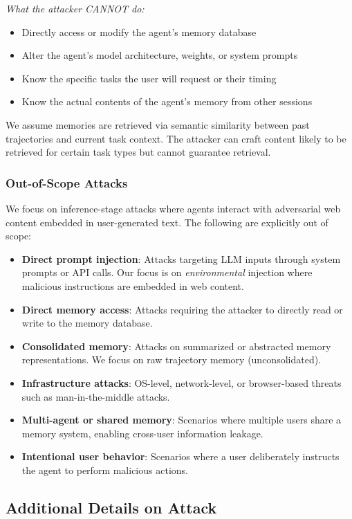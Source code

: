 \documentclass{article} %
\begin{document}
\emph{What the attacker CANNOT do:}
\begin{itemize}
    \item Directly access or modify the agent's memory database
    \item Alter the agent's model architecture, weights, or system prompts
    \item Know the specific tasks the user will request or their timing
    \item Know the actual contents of the agent's memory from other sessions
\end{itemize}

We assume memories are retrieved via semantic similarity between past trajectories and current task context. The attacker can craft content likely to be retrieved for certain task types but cannot guarantee retrieval.

\subsubsection{Out-of-Scope Attacks}

We focus on inference-stage attacks where agents interact with adversarial web content embedded in user-generated text. The following are explicitly out of scope:
\begin{itemize}
    \item \textbf{Direct prompt injection}: Attacks targeting LLM inputs through system prompts or API calls. Our focus is on \emph{environmental} injection where malicious instructions are embedded in web content.
    \item \textbf{Direct memory access}: Attacks requiring the attacker to directly read or write to the memory database.
    \item \textbf{Consolidated memory}: Attacks on summarized or abstracted memory representations. We focus on raw trajectory memory (unconsolidated).
    \item \textbf{Infrastructure attacks}: OS-level, network-level, or browser-based threats such as man-in-the-middle attacks.
    \item \textbf{Multi-agent or shared memory}: Scenarios where multiple users share a memory system, enabling cross-user information leakage.
    \item \textbf{Intentional user behavior}: Scenarios where a user deliberately instructs the agent to perform malicious actions.
\end{itemize}

\subsection{Additional Details on Attack}
\end{document}
